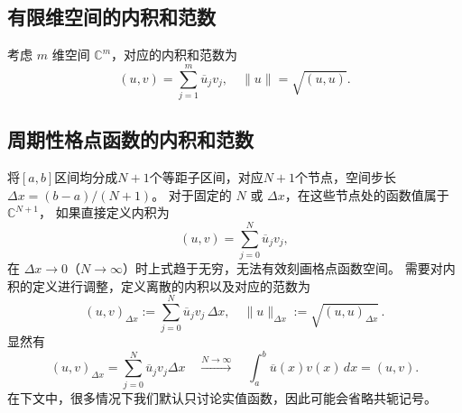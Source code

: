 \subsection*{有限维空间的内积和范数}

考虑 $m$ 维空间 $\mathbb{C}^m$，对应的内积和范数为
\[
    (u,v) = \sum_{j=1}^m \overline{u}_j v_j,\quad \|u\| = \sqrt{(u,u)}.
\]

\subsection*{周期性格点函数的内积和范数}

将$[a,b]$区间均分成$N+1$个等距子区间，对应$N+1$个节点，空间步长 $\Delta x = (b-a)/(N+1)$。
对于固定的 $N$ 或 $\Delta x$，在这些节点处的函数值属于 $\mathbb{C}^{N+1}$，
如果直接定义内积为
\[
    (u,v) = \sum_{j=0}^N \overline{u}_j v_j,
\]
在 $\Delta x \to 0$（$N \to \infty$）时上式趋于无穷，无法有效刻画格点函数空间。
需要对内积的定义进行调整，定义离散的内积以及对应的范数为
\[
    (u,v)_{\Delta x} := \sum_{j=0}^N \overline{u}_j v_j \,\Delta x,
    \quad \|u\|_{\Delta x} := \sqrt{(u,u)_{\Delta x}}\,.
\]
显然有
\[
    (u,v)_{\Delta x} = \sum_{j=0}^N \overline{u}_j v_j \Delta x
    \quad \xrightarrow{N \to \infty} \quad
    \int_a^b \overline{u}(x) v(x)\,dx = (u,v).
\]
在下文中，很多情况下我们默认只讨论实值函数，因此可能会省略共轭记号。

